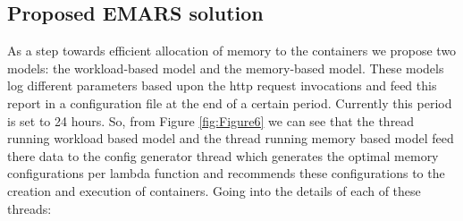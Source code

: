 \documentclass[letterpaper,twocolumn,10pt]{article}
\begin{document}
\subsection{Proposed EMARS solution}

As a step towards efficient allocation of memory to the containers we propose two models: the workload-based model and the memory-based model. 
These models log different parameters based upon the http request invocations and feed this report in a configuration file at the end of a certain period. Currently this period is set to 24 hours. So, from Figure \ref{fig:Figure6} we can see that the thread running workload based model and the thread running memory based model feed there data to the config generator thread which generates the optimal memory configurations per lambda function and recommends these configurations to the creation and execution of containers. Going into the details of each of these threads:
\end{document}

